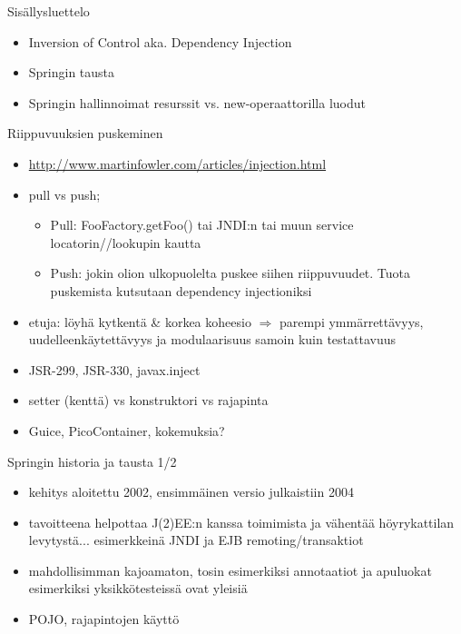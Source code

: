 \documentclass[hyperref={pdfauthor=\AUTHOR},14pt]{beamer}
\author{\AUTHOR}
\title[\TITLE]{\TITLE}
\date{\DATE}
\begin{document}
\begin{frame}[plain]
\titlepage
\end{frame}

\begin{frame}[t, fragile]{Sisällysluettelo}
\begin{itemize}
\item Inversion of Control aka. Dependency Injection
\item Springin tausta
\item Springin hallinnoimat resurssit vs. new-operaattorilla luodut
\end{itemize}
\end{frame}

\begin{frame}{Riippuvuuksien puskeminen}
\begin{itemize}
\item \url{http://www.martinfowler.com/articles/injection.html}
\item pull vs push;
\begin{itemize}
\item Pull: FooFactory.getFoo() tai JNDI:n tai muun service locatorin//lookupin kautta
\item Push: jokin olion ulkopuolelta puskee siihen
 riippuvuudet. Tuota puskemista kutsutaan dependency injectioniksi
\end{itemize}
\item etuja: löyhä kytkentä \& korkea koheesio $ \Rightarrow $ parempi
  ymmärrettävyys, uudelleenkäytettävyys ja modulaarisuus samoin kuin testattavuus
\item JSR-299, JSR-330, javax.inject
\item setter (kenttä) vs konstruktori vs rajapinta
\item Guice, PicoContainer, kokemuksia?
\end{itemize}
\end{frame}


\begin{frame}{Springin historia ja tausta 1/2}
\begin{itemize}
\item kehitys aloitettu 2002, ensimmäinen versio julkaistiin 2004
\item tavoitteena helpottaa J(2)EE:n kanssa toimimista ja vähentää
  höyrykattilan levytystä... esimerkkeinä JNDI ja EJB remoting/transaktiot
\item mahdollisimman kajoamaton, tosin esimerkiksi annotaatiot ja
  apuluokat esimerkiksi yksikkötesteissä ovat yleisiä
\item POJO, rajapintojen käyttö
\end{itemize}
\end{frame}
\end{document}
